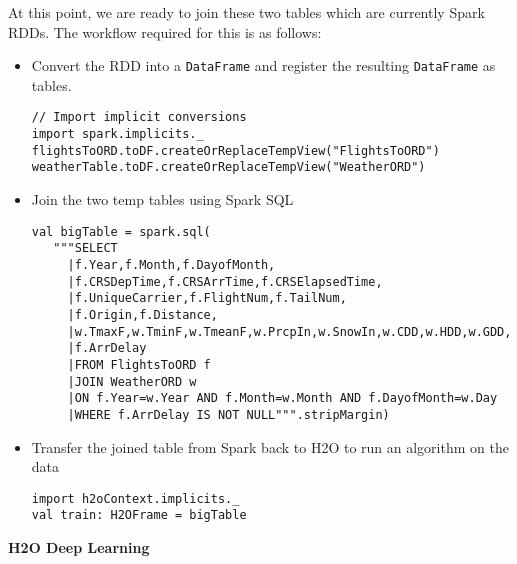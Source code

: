 At this point, we are ready to join these two tables which are currently Spark RDDs. The workflow required for this is as follows:
\begin{itemize}
\item Convert the RDD into a \texttt{DataFrame} and register the resulting \texttt{DataFrame} as tables.
\begin{lstlisting}[style=Scala]
// Import implicit conversions
import spark.implicits._
flightsToORD.toDF.createOrReplaceTempView("FlightsToORD")
weatherTable.toDF.createOrReplaceTempView("WeatherORD")
\end{lstlisting}
\item Join the two temp tables using Spark SQL 
\begin{lstlisting}[style=Scala]
val bigTable = spark.sql(
   """SELECT
     |f.Year,f.Month,f.DayofMonth,
     |f.CRSDepTime,f.CRSArrTime,f.CRSElapsedTime,
     |f.UniqueCarrier,f.FlightNum,f.TailNum,
     |f.Origin,f.Distance,
     |w.TmaxF,w.TminF,w.TmeanF,w.PrcpIn,w.SnowIn,w.CDD,w.HDD,w.GDD,
     |f.ArrDelay
     |FROM FlightsToORD f
     |JOIN WeatherORD w
     |ON f.Year=w.Year AND f.Month=w.Month AND f.DayofMonth=w.Day
     |WHERE f.ArrDelay IS NOT NULL""".stripMargin)
\end{lstlisting}

\item Transfer the joined table from Spark back to H2O to run an algorithm on the data
\begin{lstlisting}[style=Scala]
import h2oContext.implicits._
val train: H2OFrame = bigTable
\end{lstlisting}
\end{itemize}


\textbf{H2O Deep Learning}

